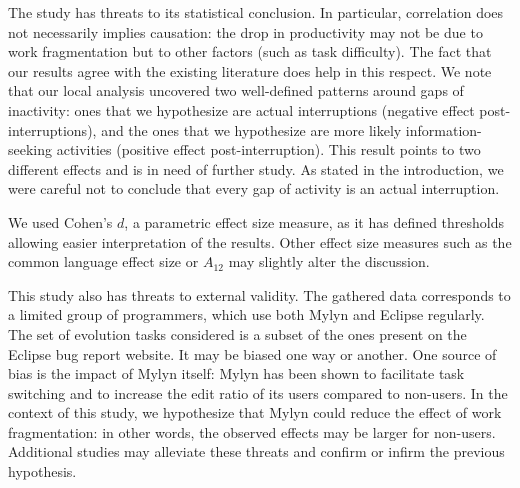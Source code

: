\documentclass[conference]{IEEEtran}
\begin{document}

The study has threats to its statistical conclusion. In particular, correlation does not necessarily implies causation: the drop in productivity may not be due to work fragmentation but to other factors (such as task difficulty). The fact that our results agree with the existing literature does help in this respect. We note that our local analysis uncovered two well-defined patterns around gaps of inactivity: ones that we hypothesize are actual interruptions (negative effect post-interruptions), and the ones that we hypothesize are more likely information-seeking activities (positive effect post-interruption). This result points to two different effects and is in need of further study. As stated in the introduction, we were careful not to conclude that every gap of activity is an actual interruption.

We used Cohen's $d$, a parametric effect size measure, as it has defined thresholds allowing easier interpretation of the results. Other effect size measures such as the common language effect size \cite{KMW92} or $A_{12}$ \cite{RRT12} may slightly alter the discussion.

This study also has threats to external validity. The gathered data corresponds to a limited group of programmers, which use both Mylyn and Eclipse regularly. The set of evolution tasks considered is a subset of the ones present on the Eclipse bug report website. It may be biased one way or another. One source of bias is the impact of Mylyn itself: Mylyn has been shown to facilitate task switching and to increase the edit ratio of its users compared to non-users. In the context of this study, we hypothesize that Mylyn could reduce the effect of work fragmentation: in other words, the observed effects may be larger for non-users. Additional studies may alleviate these threats and confirm or infirm the previous hypothesis.

\end{document}
